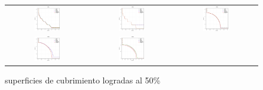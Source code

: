 \begin{figure}[H]
\caption{superficies de cubrimiento logradas al 50\%}%
\label{fig:Superficies_MOEAs}
\begin{tabular}{ccc}
  \includegraphics[width=0.33\textwidth]{Figures_Chapter7/Results_Chapter4/Surface_Representative/WFG1.eps}  &
  \includegraphics[width=0.33\textwidth]{Figures_Chapter7/Results_Chapter4/Surface_Representative/WFG2.eps} &
  \includegraphics[width=0.33\textwidth]{Figures_Chapter7/Results_Chapter4/Surface_Representative/WFG6.eps} \\
  \includegraphics[width=0.33\textwidth]{Figures_Chapter7/Results_Chapter4/Surface_Representative/WFG8.eps} &
  \includegraphics[width=0.33\textwidth]{Figures_Chapter7/Results_Chapter4/Surface_Representative/DTLZ6.eps} &

\end{tabular}
\end{figure}
